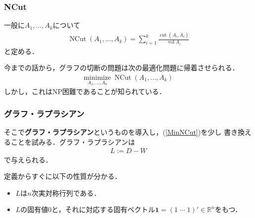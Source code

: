 \documentclass[10pt,hyperref={unicode}]{beamer}
\DeclareMathOperator*{\cut}{cut}
\DeclareMathOperator*{\vol}{vol}
\DeclareMathOperator*{\NCut}{NCut}
\newcommand{\pref}[1]{{\fontfamily{cmr}\selectfont (\ref{#1})}}
\newcommand{\parentheses}[1]{\left(#1\right)}
\begin{document}
\begin{frame}
\frametitle{NCut}
一般に$A_1,\ldots,A_k$について
\begin{align*}
    \NCut \parentheses{A_1,\ldots,A_k} = \sum_{i = 1}^k \frac{\cut\parentheses{A_i,\overline{A_i}}}{\vol A_i}
\end{align*}
と定める．

\bigskip

今までの話から，グラフの切断の問題は次の最適化問題に帰着させられる．
\begin{align}
    \underset{A_1,\ldots,A_k}{\mathrm{minimize}}\ \NCut\parentheses{A_1,\ldots,A_k} \label{MinNCut}
\end{align}
しかし，これはNP困難であることが知られている．
\end{frame}

\begin{frame}
\frametitle{グラフ・ラプラシアン}
そこで\textbf{グラフ・ラプラシアン}というものを導入し，\pref{MinNCut}を少し
書き換えることを試みる．グラフ・ラプラシアンは
\begin{align*}
    L := D - W
\end{align*}
で与えられる．

\bigskip

定義からすぐに以下の性質が分かる．
\begin{itemize}
    \item $L$は$n$次実対称行列である．
    \item $L$の固有値$0$と，それに対応する固有ベクトル$\bm{1} = \parentheses{1 \; \cdots \; 1}' \in \mathbb{R}^n$をもつ．
\end{itemize}
\end{frame}

\end{document}
